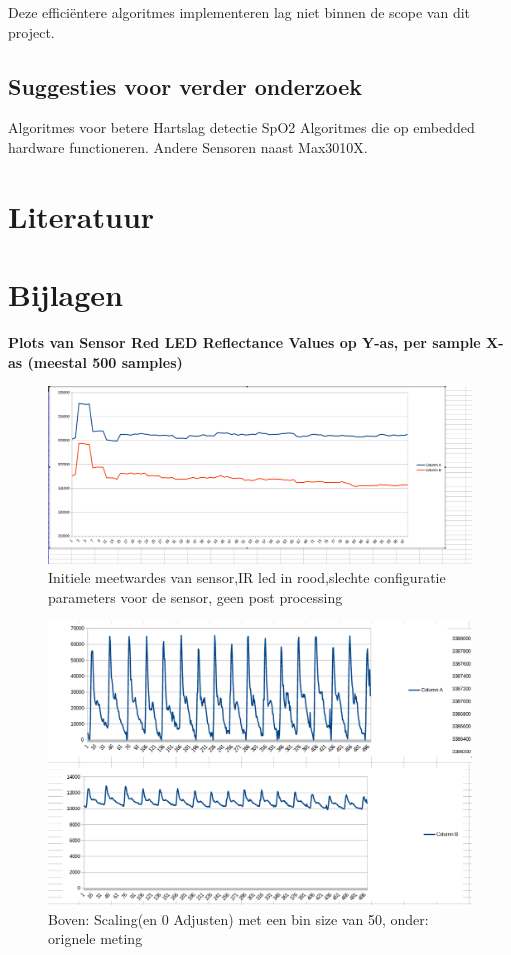 \documentclass[11pt]{article}
\begin{document}
Deze efficiëntere algoritmes implementeren lag niet binnen de scope van dit project.




    \subsection{Suggesties voor verder onderzoek}\label{subsec:suggesties-voor-verder-onderzoek}


Algoritmes voor betere Hartslag detectie
SpO2 Algoritmes die op embedded  hardware functioneren.
Andere Sensoren naast Max3010X.



    \section{Literatuur}\label{sec:literatuur}
    
    \pagebreak

    \section{Bijlagen}\label{sec:bijlagen}
    \textbf{Plots van Sensor Red LED Reflectance Values op Y-as, per sample X-as (meestal 500 samples)}

\begin{figure}[h]
	\centering
	\caption{Initiele meetwardes van sensor,IR led in rood,slechte configuratie parameters voor de sensor, geen post processing}
    \includegraphics[height=0.4\textheight]{Images/r1.png}
\end{figure}

\begin{figure}
	\caption{Boven: Scaling(en 0 Adjusten) met een bin size van 50, onder: orignele meting}
   \hfill\includegraphics[height=0.75\textheight]{Images/r2.png}
\end{figure}
\end{document}
